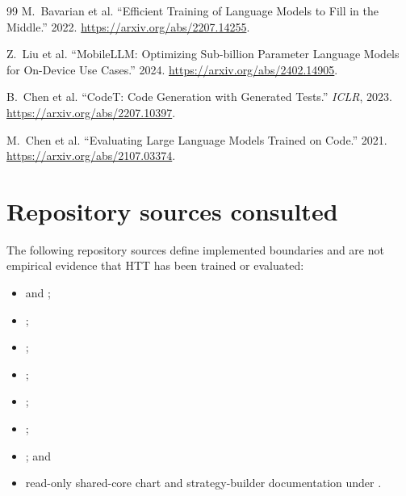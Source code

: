 \documentclass[10pt,letterpaper]{article}
\newcommand{\code}[1]{\texttt{\detokenize{#1}}}
\newcommand{\1}{\mathbb{1}}
\begin{document}
\begin{thebibliography}{99}
M.~Bavarian et al. ``Efficient Training of Language Models to Fill in the Middle.'' 2022.
\url{https://arxiv.org/abs/2207.14255}.

Z.~Liu et al. ``MobileLLM: Optimizing Sub-billion Parameter Language Models for On-Device Use Cases.''
2024. \url{https://arxiv.org/abs/2402.14905}.

B.~Chen et al. ``CodeT: Code Generation with Generated Tests.'' \emph{ICLR}, 2023.
\url{https://arxiv.org/abs/2207.10397}.

M.~Chen et al. ``Evaluating Large Language Models Trained on Code.'' 2021.
\url{https://arxiv.org/abs/2107.03374}.

\end{thebibliography}

\section*{Repository sources consulted}

The following repository sources define implemented boundaries and are not empirical evidence that
HTT has been trained or evaluated:
\begin{itemize}
  \item \code{AGENTS.md} and \code{README.md};
  \item {};
  \item {};
  \item {};
  \item {};
  \item {};
  \item {}; and
  \item read-only shared-core chart and strategy-builder documentation under \code{public/}.
\end{itemize}
\end{document}
